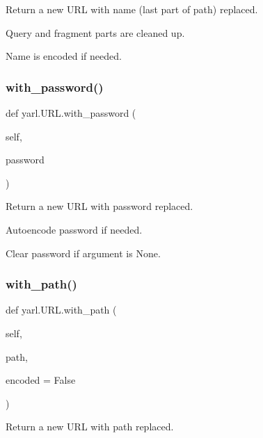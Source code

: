 \begin{DoxyVerb}Return a new URL with name (last part of path) replaced.

Query and fragment parts are cleaned up.

Name is encoded if needed.\end{DoxyVerb}
 \mbox{\label{classyarl_1_1_u_r_l_abc2345cbea010188a08667baca670767}} 
\subsubsection{\texorpdfstring{with\+\_\+password()}{with\_password()}}
{\footnotesize\ttfamily def yarl.\+U\+R\+L.\+with\+\_\+password (\begin{DoxyParamCaption}\item[{}]{self,  }\item[{}]{password }\end{DoxyParamCaption})}

\begin{DoxyVerb}Return a new URL with password replaced.

Autoencode password if needed.

Clear password if argument is None.\end{DoxyVerb}
 \mbox{\label{classyarl_1_1_u_r_l_a290cebea7739ab44f0d4517e22fe8140}} 
\subsubsection{\texorpdfstring{with\+\_\+path()}{with\_path()}}
{\footnotesize\ttfamily def yarl.\+U\+R\+L.\+with\+\_\+path (\begin{DoxyParamCaption}\item[{}]{self,  }\item[{}]{path,  }\item[{}]{encoded = {\ttfamily False} }\end{DoxyParamCaption})}

\begin{DoxyVerb}Return a new URL with path replaced.\end{DoxyVerb}
 \mbox{\label{classyarl_1_1_u_r_l_a88cd2011f1e911ae5d03a7d9e6cd32f5}} 
